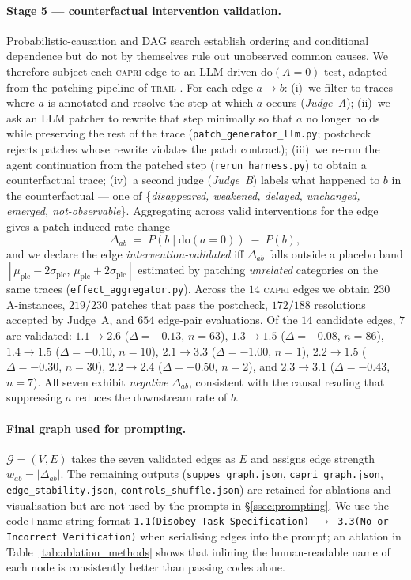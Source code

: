 \paragraph{Stage 5 — counterfactual intervention validation.}
Probabilistic-causation and DAG search establish ordering and
conditional dependence but do not by themselves rule out unobserved
common causes. We therefore subject each \textsc{capri} edge to an
LLM-driven $\mathrm{do}(A{=}0)$ test, adapted from the patching
pipeline of \textsc{trail} \citep{cemri2025whymast}. For each edge
$a\!\to\!b$:
(i)~we filter to traces where $a$ is annotated and resolve the step at
which $a$ occurs (\emph{Judge~A});
(ii)~we ask an LLM patcher to rewrite that step minimally so that $a$
no longer holds while preserving the rest of the trace
(\texttt{patch\_generator\_llm.py}; postcheck rejects patches whose
rewrite violates the patch contract);
(iii)~we re-run the agent continuation from the patched step
(\texttt{rerun\_harness.py}) to obtain a counterfactual trace;
(iv)~a second judge (\emph{Judge~B}) labels what happened to $b$ in
the counterfactual --- one of \{\textit{disappeared, weakened, delayed,
unchanged, emerged, not-observable}\}.
Aggregating across valid interventions for the edge gives a
patch-induced rate change
\[
\Delta_{ab} \;=\; P(b\!\mid\!\mathrm{do}(a{=}0)) \;-\; P(b),
\]
and we declare the edge \emph{intervention-validated} iff $\Delta_{ab}$
falls outside a placebo band
$[\mu_{\mathrm{plc}}-2\sigma_{\mathrm{plc}},\,\mu_{\mathrm{plc}}+2\sigma_{\mathrm{plc}}]$
estimated by patching \emph{unrelated} categories on the same traces
(\texttt{effect\_aggregator.py}). Across the $14$ \textsc{capri} edges
we obtain $230$ A-instances, $219/230$ patches that pass the postcheck,
$172/188$ resolutions accepted by Judge~A, and $654$ edge-pair
evaluations. Of the $14$ candidate edges, $7$ are validated:
$1.1\!\to\!2.6$ ($\Delta{=}{-}0.13$, $n{=}63$),
$1.3\!\to\!1.5$ ($\Delta{=}{-}0.08$, $n{=}86$),
$1.4\!\to\!1.5$ ($\Delta{=}{-}0.10$, $n{=}10$),
$2.1\!\to\!3.3$ ($\Delta{=}{-}1.00$, $n{=}1$),
$2.2\!\to\!1.5$ ($\Delta{=}{-}0.30$, $n{=}30$),
$2.2\!\to\!2.4$ ($\Delta{=}{-}0.50$, $n{=}2$), and
$2.3\!\to\!3.1$ ($\Delta{=}{-}0.43$, $n{=}7$). All seven exhibit
\emph{negative} $\Delta_{ab}$, consistent with the causal reading that
suppressing $a$ reduces the downstream rate of $b$.

\paragraph{Final graph used for prompting.}
$\mathcal{G}=(V,E)$ takes the seven validated edges as $E$ and assigns
edge strength $w_{ab}=|\Delta_{ab}|$. The remaining outputs
(\texttt{suppes\_graph.json}, \texttt{capri\_graph.json},
\texttt{edge\_stability.json}, \texttt{controls\_shuffle.json}) are
retained for ablations and visualisation but are not used by the
prompts in \S\ref{ssec:prompting}. We use the code+name string format
\texttt{1.1(Disobey Task Specification)\,$\rightarrow$\,3.3(No or
Incorrect Verification)} when serialising edges into the prompt; an
ablation in Table~\ref{tab:ablation_methods} shows that inlining the
human-readable name of each node is consistently better than passing
codes alone.

